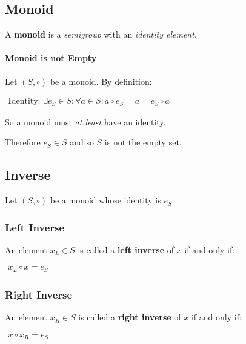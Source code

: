 \subsection{Monoid}
\label{sec:monoid}

A \textbf{monoid} is a \textit{semigroup} with an \textit{identity
  element}.

\paragraph{Monoid is not Empty}

Let $(S, \circ)$ be a monoid. By definition:

\begin{math}
  \begin{array}{c}
    \text{Identity: } \exists e_S \in S : \forall a \in S: a \circ e_S = a = e_S \circ a
  \end{array}
\end{math}

So a monoid must \textit{at least} have an identity.

Therefore $e_S \in S $ and so $S$ is not the empty set.


\subsection{Inverse}
\label{sec:inverse}

Let $(S, \circ)$ be a monoid whose identity is $e_S$.

\subsubsection{Left Inverse}
An element $x_L \in S$ is called a \textbf{left inverse} of $x$ if and
only if:

\begin{math}
  \begin{array}{c}
    x_L \circ x = e_S
  \end{array}
\end{math}


\subsubsection{Right Inverse}
An element $x_R \in S$ is called a \textbf{right inverse} of $x$ if and
only if:

\begin{math}
  \begin{array}{c}
    x \circ x_R = e_S
  \end{array}
\end{math}

